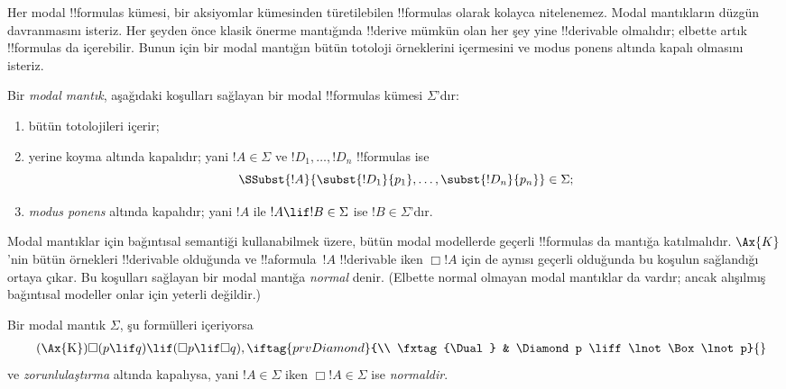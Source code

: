 \documentclass[../../../include/open-logic-section]{subfiles}
\begin{document}


Her modal !!{formula}s kümesi, bir aksiyomlar kümesinden türetilebilen
!!{formula}s olarak kolayca nitelenemez. Modal mantıkların düzgün davranmasını
isteriz. Her şeyden önce klasik önerme mantığında !!{derive} mümkün olan her
şey yine !!{derivable} olmalıdır; elbette artık !!{formula}s
 da içerebilir. Bunun için bir modal mantığın bütün totoloji
örneklerini içermesini ve modus ponens altında kapalı olmasını isteriz.

\begin{defn}
  Bir \emph{modal mantık}, aşağıdaki koşulları sağlayan bir modal
  !!{formula}s kümesi $\Sigma$'dır:
  \begin{enumerate}
  \item bütün totolojileri içerir;
  \item yerine koyma altında kapalıdır; yani $!A\in\Sigma$ ve
    $!D_1,\dots,!D_n$ !!{formula}s ise
    \[
    \SSubst{!A}{\subst{!D_1}{p_1}, \dots, \subst{!D_n}{p_n}} \in \Sigma;
    \]
  \item \emph{modus ponens} altında kapalıdır; yani $!A$ ile
    $!A\lif !B\in\Sigma$ ise $!B\in\Sigma$'dır.
  \end{enumerate}
\end{defn}

Modal mantıklar için bağıntısal semantiği kullanabilmek üzere, bütün modal
modellerde geçerli !!{formula}s da mantığa katılmalıdır.
$\Ax{K}$'nin bütün örnekleri
!!{derivable} olduğunda ve !!a{formula}~$!A$ !!{derivable} iken $\Box !A$
için de aynısı geçerli olduğunda bu koşulun sağlandığı ortaya çıkar. Bu koşulları
sağlayan bir modal mantığa \emph{normal} denir. (Elbette normal olmayan
modal mantıklar da vardır; ancak alışılmış bağıntısal modeller onlar için
yeterli değildir.)

\begin{defn}
  Bir modal mantık $\Sigma$, şu formülleri içeriyorsa
  \begin{align*}
    \tag{\Ax{K}} & \Box(p \lif q) \lif (\Box p \lif \Box q),
    \iftag{prvDiamond}{\\
      \tag{\Dual} & \Diamond p \liff \lnot\Box\lnot p}{}
  \end{align*}
  ve \emph{zorunlulaştırma} altında kapalıysa, yani $!A\in\Sigma$ iken
  $\Box !A\in\Sigma$ ise \emph{normaldir}.
\end{defn}
\end{document}
